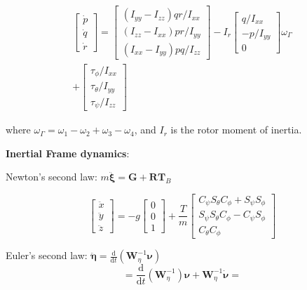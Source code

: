 $$
\begin{array}{c}
\left[ \begin{array}{c}{\dot{p}} \\ {\dot{q}} \\ {\dot{r}}\end{array}\right]= 
\left[ \begin{array}{c}{\left(I_{y y}-I_{z z}\right) q r / I_{x x}} \\ {\left(I_{z z}-I_{x x}\right) p r / I_{y y}} \\ {(I_{x x}-I_{y y}) p q / I_{z z}}\end{array}\right] 
- I_{r} \left[ \begin{array}{c}{q / I_{x x}} \\ {-p / I_{y y}} \\ {0}\end{array}\right] \omega_{\Gamma} \\
+ \left[ \begin{array}{c}{\tau_{\phi} / I_{x x}} \\ {\tau_{\theta} / I_{y y}} \\ {\tau_{\psi} / I_{z z}}\end{array}\right]
\end{array}
  $$

  where $\omega_\Gamma = \omega_1 - \omega_2 + \omega_3 - \omega_4$, and $I_r$ is the rotor moment of inertia.


\textbf{Inertial Frame dynamics}:

Newton's second law: $m \ddot{\boldsymbol{\xi}}=\boldsymbol{G}+\boldsymbol{R} \boldsymbol{T}_{B}$

$$\left[ \begin{array}{c}{\ddot{x}} \\ {\ddot{y}} \\ {\ddot{z}}\end{array}\right]=-g \left[ \begin{array}{l}{0} \\ {0} \\ {1}\end{array}\right]+\frac{T}{m} \left[ \begin{array}{c}{C_{\psi} S_{\theta} C_{\phi}+S_{\psi} S_{\phi}} \\ {S_{\psi} S_{\theta} C_{\phi}-C_{\psi} S_{\phi}} \\ {C_{\theta} C_{\phi}}\end{array}\right]$$

Euler's second law: $\ddot{\boldsymbol{\eta}}=\frac{\mathrm{d}}{\mathrm{d} t}\left(\boldsymbol{W}_{\eta}^{-1} \boldsymbol{\nu}\right)$ 
$$=\frac{\mathrm{d}}{\mathrm{d} t}\left(\boldsymbol{W}_{\eta}^{-1}\right) \boldsymbol{\nu}+\boldsymbol{W}_{\eta}^{-1} \dot{\boldsymbol{\nu}} = $$

